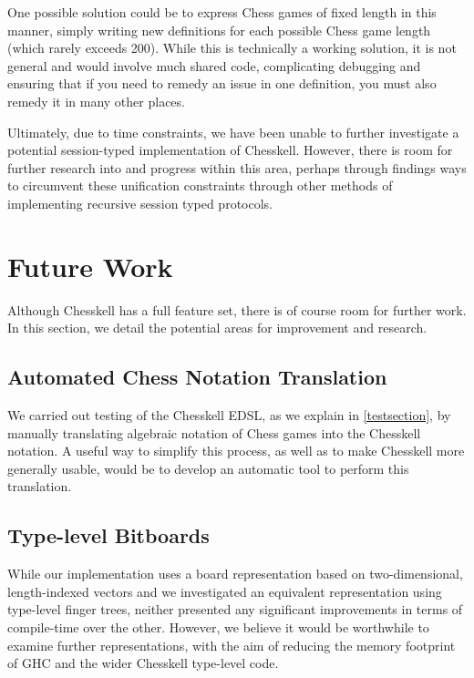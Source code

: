 One possible solution could be to express Chess games of fixed length in this manner, simply writing new definitions for each possible Chess game length (which rarely exceeds 200). While this is technically a working solution, it is not general and would involve much shared code, complicating debugging and ensuring that if you need to remedy an issue in one definition, you must also remedy it in many other places.

Ultimately, due to time constraints, we have been unable to further investigate a potential session-typed implementation of Chesskell. However, there is room for further research into and progress within this area, perhaps through findings ways to circumvent these unification constraints through other methods of implementing recursive session typed protocols.



\section{Future Work}

Although Chesskell has a full feature set, there is of course room for further work. In this section, we detail the potential areas for improvement and research.

\subsection{Automated Chess Notation Translation}

We carried out testing of the Chesskell EDSL, as we explain in \cref{testsection}, by manually translating algebraic notation of Chess games into the Chesskell notation. A useful way to simplify this process, as well as to make Chesskell more generally usable, would be to develop an automatic tool to perform this translation.


\subsection{Type-level Bitboards} \label{bitboardconclusion}

While our implementation uses a board representation based on two-dimensional, length-indexed vectors and we investigated an equivalent representation using type-level finger trees, neither presented any significant improvements in terms of compile-time over the other. However, we believe it would be worthwhile to examine further representations, with the aim of reducing the memory footprint of GHC and the wider Chesskell type-level code.

